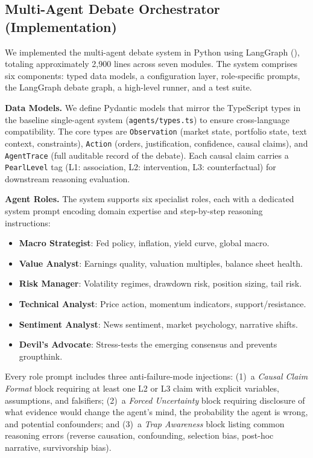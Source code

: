\subsection{Multi-Agent Debate Orchestrator (Implementation)}

We implemented the multi-agent debate system in Python using LangGraph (\cite{langchain}), totaling approximately 2{,}900 lines across seven modules. The system comprises six components: typed data models, a configuration layer, role-specific prompts, the LangGraph debate graph, a high-level runner, and a test suite.

\textbf{Data Models.}
We define Pydantic models that mirror the TypeScript types in the baseline single-agent system (\texttt{agents/types.ts}) to ensure cross-language compatibility. The core types are \texttt{Observation} (market state, portfolio state, text context, constraints), \texttt{Action} (orders, justification, confidence, causal claims), and \texttt{AgentTrace} (full auditable record of the debate). Each causal claim carries a \texttt{PearlLevel} tag (L1: association, L2: intervention, L3: counterfactual) for downstream reasoning evaluation.

\textbf{Agent Roles.}
The system supports six specialist roles, each with a dedicated system prompt encoding domain expertise and step-by-step reasoning instructions:
\begin{itemize}
\setlength\itemsep{0pt}
  \item \textbf{Macro Strategist}: Fed policy, inflation, yield curve, global macro.
  \item \textbf{Value Analyst}: Earnings quality, valuation multiples, balance sheet health.
  \item \textbf{Risk Manager}: Volatility regimes, drawdown risk, position sizing, tail risk.
  \item \textbf{Technical Analyst}: Price action, momentum indicators, support/resistance.
  \item \textbf{Sentiment Analyst}: News sentiment, market psychology, narrative shifts.
  \item \textbf{Devil's Advocate}: Stress-tests the emerging consensus and prevents groupthink.
\end{itemize}

Every role prompt includes three anti-failure-mode injections: (1)~a \emph{Causal Claim Format} block requiring at least one L2 or L3 claim with explicit variables, assumptions, and falsifiers; (2)~a \emph{Forced Uncertainty} block requiring disclosure of what evidence would change the agent's mind, the probability the agent is wrong, and potential confounders; and (3)~a \emph{Trap Awareness} block listing common reasoning errors (reverse causation, confounding, selection bias, post-hoc narrative, survivorship bias).


